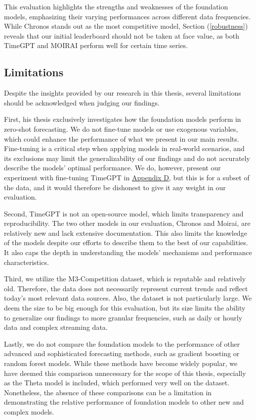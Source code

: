 \documentclass[12pt,a4paper]{article}
\begin{document}
This evaluation highlights the strengths and weaknesses of the foundation models, emphasizing their varying performances across different data frequencies. While Chronos stands out as the most competitive model, Section (\ref{robustness}) reveals that our initial leaderboard should not be taken at face value, as both TimeGPT and MOIRAI perform well for certain time series.

\subsection{Limitations}

Despite the insights provided by our research in this thesis, several limitations should be acknowledged when judging our findings.

First, his thesis exclusively investigates how the foundation models perform in zero-shot forecasting. We do not fine-tune models or use exogenous variables, which could enhance the performance of what we present in our main results. Fine-tuning is a critical step when applying models in real-world scenarios, and its exclusions may limit the generalizability of our findings and do not accurately describe the models’ optimal performance. We do, however, present our experiment with fine-tuning TimeGPT in \hyperref[appendix_d]{Appendix D}, but this is for a subset of the data, and it would therefore be dishonest to give it any weight in our evaluation. 

Second, TimeGPT is not an open-source model, which limits transparency and reproducibility. The two other models in our evaluation, Chronos and Moirai, are relatively new and lack extensive documentation. This also limits the knowledge of the models despite our efforts to describe them to the best of our capabilities. It also caps the depth in understanding the models’ mechanisms and performance characteristics. 

Third, we utilize the M3-Competition dataset, which is reputable and relatively old. Therefore, the data does not necessarily represent current trends and reflect today's most relevant data sources. Also, the dataset is not particularly large. We deem the size to be big enough for this evaluation, but its size limits the ability to generalize our findings to more granular frequencies, such as daily or hourly data and complex streaming data. 

Lastly, we do not compare the foundation models to the performance of other advanced and sophisticated forecasting methods, such as gradient boosting or random forest models. While these methods have become widely popular, we have deemed this comparison unnecessary for the scope of this thesis, especially as the Theta model is included, which performed very well on the dataset. Nonetheless, the absence of these comparisons can be a limitation in demonstrating the relative performance of foundation models to other new and complex models.  
\end{document}
